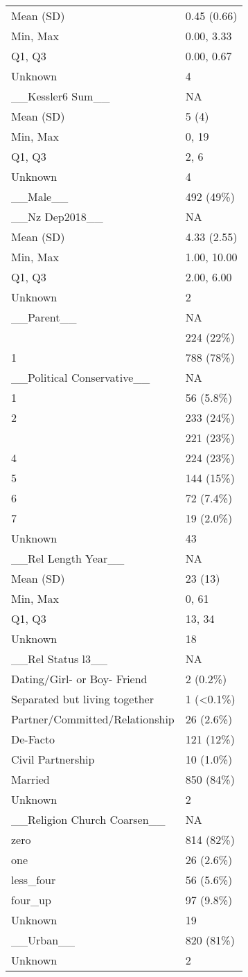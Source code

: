 \documentclass[
  singlecolumn]{article}
\begin{document}
\begin{tabular}[t]{ll}
Mean (SD) & 0.45 (0.66)\\
\addlinespace
Min, Max & 0.00, 3.33\\
Q1, Q3 & 0.00, 0.67\\
Unknown & 4\\
\_\_Kessler6 Sum\_\_ & NA\\
Mean (SD) & 5 (4)\\
\addlinespace
Min, Max & 0, 19\\
Q1, Q3 & 2, 6\\
Unknown & 4\\
\_\_Male\_\_ & 492 (49\%)\\
\_\_Nz Dep2018\_\_ & NA\\
\addlinespace
Mean (SD) & 4.33 (2.55)\\
Min, Max & 1.00, 10.00\\
Q1, Q3 & 2.00, 6.00\\
Unknown & 2\\
\_\_Parent\_\_ & NA\\
\addlinespace
0 & 224 (22\%)\\
1 & 788 (78\%)\\
\_\_Political Conservative\_\_ & NA\\
1 & 56 (5.8\%)\\
2 & 233 (24\%)\\
\addlinespace
3 & 221 (23\%)\\
4 & 224 (23\%)\\
5 & 144 (15\%)\\
6 & 72 (7.4\%)\\
7 & 19 (2.0\%)\\
\addlinespace
Unknown & 43\\
\_\_Rel Length Year\_\_ & NA\\
Mean (SD) & 23 (13)\\
Min, Max & 0, 61\\
Q1, Q3 & 13, 34\\
\addlinespace
Unknown & 18\\
\_\_Rel Status l3\_\_ & NA\\
Dating/Girl- or Boy- Friend & 2 (0.2\%)\\
Separated but living together & 1 (<0.1\%)\\
Partner/Committed/Relationship & 26 (2.6\%)\\
\addlinespace
De-Facto & 121 (12\%)\\
Civil Partnership & 10 (1.0\%)\\
Married & 850 (84\%)\\
Unknown & 2\\
\_\_Religion Church Coarsen\_\_ & NA\\
\addlinespace
zero & 814 (82\%)\\
one & 26 (2.6\%)\\
less\_four & 56 (5.6\%)\\
four\_up & 97 (9.8\%)\\
Unknown & 19\\
\addlinespace
\_\_Urban\_\_ & 820 (81\%)\\
Unknown & 2\\
\bottomrule
\end{tabular}
\end{document}
